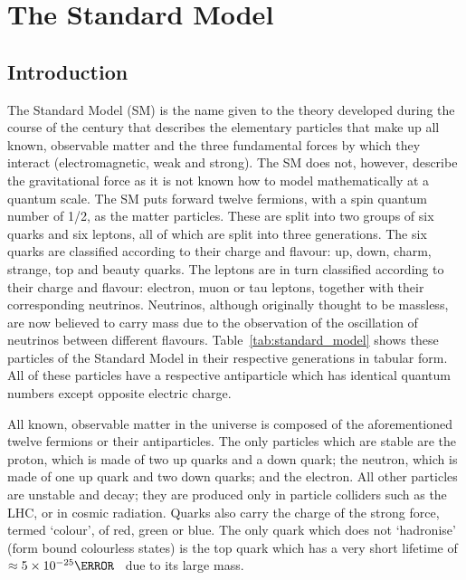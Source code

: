 \chapter{The Standard Model}
\label{c:the_standard_model}

\section{Introduction}
\label{s:standard_model_intro}

The Standard Model (SM) is the name given to the theory developed during the course of the  century
that describes the elementary particles that make up all known, observable matter and the three fundamental
forces by which they interact (electromagnetic, weak and strong). The SM does not, however, describe the
gravitational force as it is not known how to model mathematically at a quantum scale. The SM puts forward
twelve fermions, with a spin quantum number of 1/2, as the matter particles.
These are split into two groups of six quarks and six leptons, all of which are split into three generations.
The six quarks are classified according to their charge and flavour: up, down, charm, strange, top and beauty
quarks. The leptons are in turn classified according to their charge and flavour: electron, muon or tau
leptons, together with their corresponding neutrinos. Neutrinos, although originally thought to be massless,
are now believed to carry mass due to the observation of the oscillation of neutrinos between different
flavours. Table~\ref{tab:standard_model} shows these particles of the Standard Model in their respective
generations in tabular form. All of these particles have a respective antiparticle which has identical quantum
numbers except opposite electric charge.



All known, observable matter in the universe is composed of the aforementioned twelve fermions or their
antiparticles. The only particles which are stable are the proton, which is made of two up quarks and a down
quark; the neutron, which is made of one up quark and two down quarks; and the electron. All other particles
are unstable and decay; they are produced only in particle colliders such as the LHC, or in
cosmic radiation. Quarks also carry the charge of the strong force, termed `colour', of red, green or blue.
The only quark which does not `hadronise' (form bound colourless states) is the top quark which has a
very short lifetime of $\approx5\times10^{-25}\s$~\cite{Agashe:2014kda} due to its large mass.

